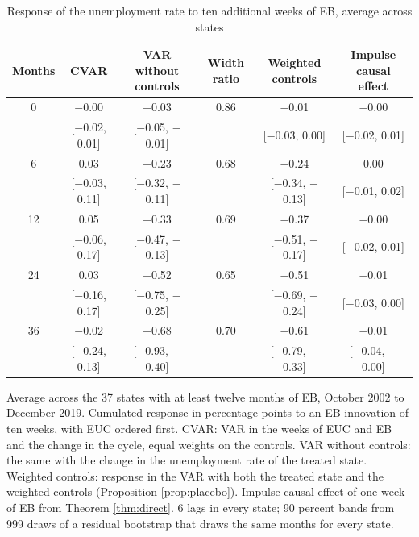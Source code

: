 \begin{table}[htbp]
\centering
\caption{Response of the unemployment rate to ten additional weeks of EB, average across states\label{tab:eb-avg}}
\small
\begin{tabular}{cccccc}
\toprule
Months & CVAR & VAR without controls & Width ratio & Weighted controls & Impulse causal effect \\
\midrule
0 & $-$0.00 & $-$0.03 & 0.86 & $-$0.01 & $-$0.00 \\
\footnotesize & [$-$0.02, 0.01] & [$-$0.05, $-$0.01] & & [$-$0.03, 0.00] & [$-$0.02, 0.01] \\[2pt]
6 & 0.03 & $-$0.23 & 0.68 & $-$0.24 & 0.00 \\
\footnotesize & [$-$0.03, 0.11] & [$-$0.32, $-$0.11] & & [$-$0.34, $-$0.13] & [$-$0.01, 0.02] \\[2pt]
12 & 0.05 & $-$0.33 & 0.69 & $-$0.37 & $-$0.00 \\
\footnotesize & [$-$0.06, 0.17] & [$-$0.47, $-$0.13] & & [$-$0.51, $-$0.17] & [$-$0.02, 0.01] \\[2pt]
24 & 0.03 & $-$0.52 & 0.65 & $-$0.51 & $-$0.01 \\
\footnotesize & [$-$0.16, 0.17] & [$-$0.75, $-$0.25] & & [$-$0.69, $-$0.24] & [$-$0.03, 0.00] \\[2pt]
36 & $-$0.02 & $-$0.68 & 0.70 & $-$0.61 & $-$0.01 \\
\footnotesize & [$-$0.24, 0.13] & [$-$0.93, $-$0.40] & & [$-$0.79, $-$0.33] & [$-$0.04, $-$0.00] \\[2pt]
\bottomrule
\end{tabular}
\par\smallskip\parbox{0.95\textwidth}{\footnotesize Average across the 37 states with at least twelve months of EB, October 2002 to December 2019. Cumulated response in percentage points to an EB innovation of ten weeks, with EUC ordered first. CVAR: VAR in the weeks of EUC and EB and the change in the cycle, equal weights on the controls. VAR without controls: the same with the change in the unemployment rate of the treated state. Weighted controls: response in the VAR with both the treated state and the weighted controls (Proposition \ref{prop:placebo}). Impulse causal effect of one week of EB from Theorem \ref{thm:direct}. 6 lags in every state; 90 percent bands from 999 draws of a residual bootstrap that draws the same months for every state.}
\end{table}
